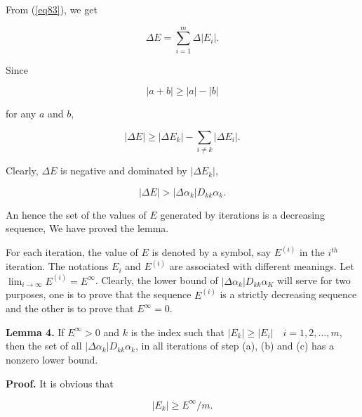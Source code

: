 \documentclass [18pt]{article}
\begin{document}
From (\ref{eq83}), we get


\begin{equation}
\label{eq107}
\Delta E = \sum\limits_{i = 1}^m {\Delta \left| {E_i } \right|} .
\end{equation}



Since


\begin{equation}
\label{eq108}
\left| {a + b} \right| \ge \left| a \right| - \left| b \right|
\end{equation}



\noindent
for any $a$ and $b$,


\begin{equation}
\label{eq109}
\left| {\Delta E} \right| \ge \left| {\Delta E_k } \right| - \sum\limits_{i
\ne k} {\left| {\Delta E_i } \right|} .
\end{equation}



Clearly, $\Delta E$ is negative and dominated by $\left| {\Delta E_k }
\right|$,


\begin{equation}
\label{eq110}
\left| {\Delta E} \right| > \left| {\Delta \alpha _k } \right|D_{kk} \alpha
_k .
\end{equation}



An hence the set of the values of $E$ generated by iterations is a
decreasing sequence, We have proved the lemma.

For each iteration, the value of $E$ is denoted by a symbol, say $E^{(i)}$
in the $i^{th}$ iteration. The notations $E_i $ and $E^{(i)}$ are associated
with different meanings. Let $\lim _{i \to \infty } E^{(i)} = E^\infty $.
Clearly, the lower bound of $\left| {\Delta \alpha _k } \right|D_{kk} \alpha
_K $ will serve for two purposes, one is to prove that the sequence
$E^{(i)}$ is a strictly decreasing sequence and the other is to prove that
$E^\infty = 0$.

\textbf{Lemma 4.} If $E^\infty > 0$ and $k$ is the index such that $\left|
{E_k } \right| \ge \left| {E_i } \right| \quad i = 1,2,...,m$, then the set of
all $\left| {\Delta \alpha _k } \right|D_{kk} \alpha _k $, in all iterations
of step (a), (b) and (c) has a nonzero lower bound.

\textbf{Proof.} It is obvious that


\begin{equation}
\label{eq111}
\left| {E_k } \right| \ge E^\infty / m.
\end{equation}
\end{document}
